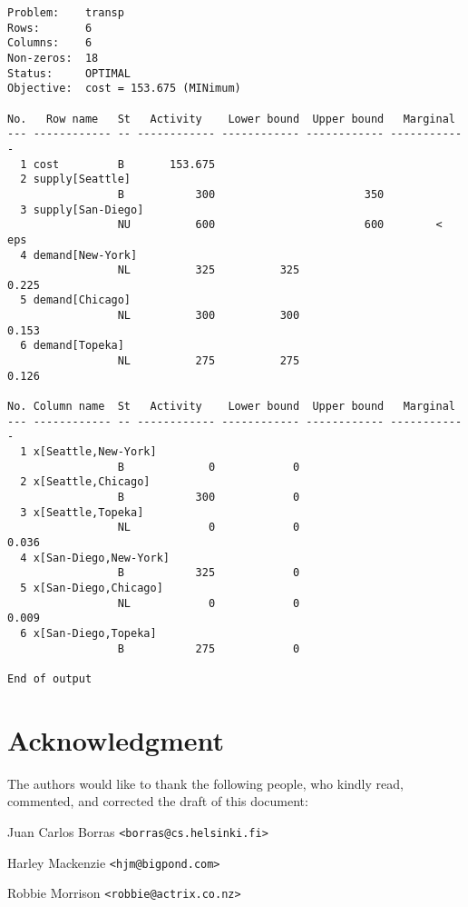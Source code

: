 \documentclass[10pt]{article}
\begin{document}
\begin{small}
\begin{verbatim}
Problem:    transp
Rows:       6
Columns:    6
Non-zeros:  18
Status:     OPTIMAL
Objective:  cost = 153.675 (MINimum)

No.   Row name   St   Activity    Lower bound  Upper bound   Marginal
--- ------------ -- ------------ ------------ ------------ ------------
  1 cost         B       153.675
  2 supply[Seattle]
                 B           300                       350
  3 supply[San-Diego]
                 NU          600                       600        < eps
  4 demand[New-York]
                 NL          325          325                     0.225
  5 demand[Chicago]
                 NL          300          300                     0.153
  6 demand[Topeka]
                 NL          275          275                     0.126

No. Column name  St   Activity    Lower bound  Upper bound   Marginal
--- ------------ -- ------------ ------------ ------------ ------------
  1 x[Seattle,New-York]
                 B             0            0
  2 x[Seattle,Chicago]
                 B           300            0
  3 x[Seattle,Topeka]
                 NL            0            0                     0.036
  4 x[San-Diego,New-York]
                 B           325            0
  5 x[San-Diego,Chicago]
                 NL            0            0                     0.009
  6 x[San-Diego,Topeka]
                 B           275            0

End of output
\end{verbatim}
\end{small}


\newpage

\setcounter{secnumdepth}{-1}

\section{Acknowledgment}

The authors would like to thank the following people, who kindly read,
commented, and corrected the draft of this document:

\medskip

\noindent Juan Carlos Borras \verb|<borras@cs.helsinki.fi>|

\medskip

\noindent Harley Mackenzie \verb|<hjm@bigpond.com>|

\medskip

\noindent Robbie Morrison \verb|<robbie@actrix.co.nz>|
\end{document}
